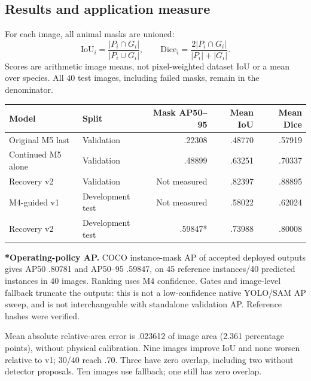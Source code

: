 \documentclass[11pt,a4paper]{article}
\begin{document}
\subsection{Results and application measure}
For each image, all animal masks are unioned:
\[\mathrm{IoU}_i=\frac{|P_i\cap G_i|}{|P_i\cup G_i|},\qquad \mathrm{Dice}_i=\frac{2|P_i\cap G_i|}{|P_i|+|G_i|}.\]
Scores are arithmetic image means, not pixel-weighted dataset IoU or a mean over species. All 40 test images, including failed masks, remain in the denominator.
\begin{center}\small\begin{tabular}{llrrr}\toprule
Model & Split & Mask AP50--95 & Mean IoU & Mean Dice\\\midrule
Original M5 last & Validation & .22308 & .48770 & .57919\\
Continued M5 alone & Validation & .48899 & .63251 & .70337\\
Recovery v2 & Validation & Not measured & .82397 & .88895\\
M4-guided v1 & Development test & Not measured & .58022 & .62024\\
Recovery v2 & Development test & .59847* & .73988 & .80008\\\bottomrule
\end{tabular}\end{center}
\textbf{*Operating-policy AP.} COCO instance-mask AP of accepted deployed outputs gives AP50 .80781 and AP50--95 .59847, on 45 reference instances/40 predicted instances in 40 images. Ranking uses M4 confidence. Gates and image-level fallback truncate the outputs: this is not a low-confidence native YOLO/SAM AP sweep, and is not interchangeable with standalone validation AP. Reference hashes were verified.

Mean absolute relative-area error is .023612 of image area (2.361 percentage points), without physical calibration. Nine images improve IoU and none worsen relative to v1; 30/40 reach .70. Three have zero overlap, including two without detector proposals. Ten images use fallback; one still has zero overlap.
\end{document}
